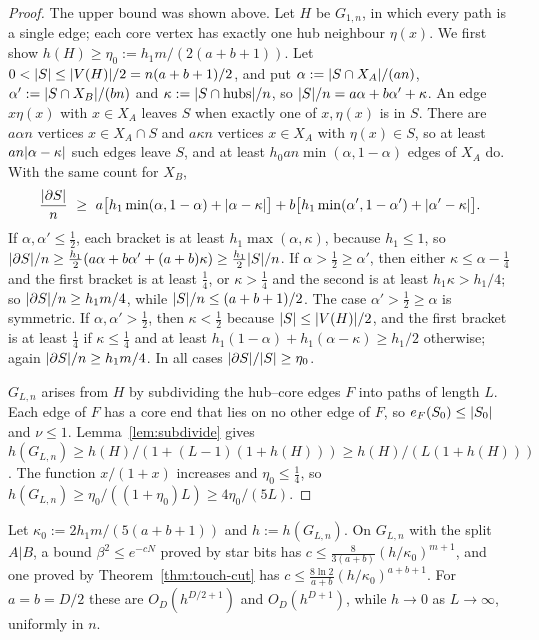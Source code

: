 \begin{proof}
The upper bound was shown above. Let $H$ be $G_{1,n}$, in which every path is a single edge; each core vertex has exactly one hub neighbour $\eta(x)$. We first show $h(H)\ge\eta_0:=h_1m/(2(a+b+1))$. Let $0<\lvert S\rvert\le\lvert V(H)\rvert/2=n(a+b+1)/2$, and put $\alpha:=\lvert S\cap X_A\rvert/(an)$, $\alpha':=\lvert S\cap X_B\rvert/(bn)$ and $\kappa:=\lvert S\cap\text{hubs}\rvert/n$, so $\lvert S\rvert/n=a\alpha+b\alpha'+\kappa$. An edge $x\eta(x)$ with $x\in X_A$ leaves $S$ when exactly one of $x,\eta(x)$ is in $S$. There are $a\alpha n$ vertices $x\in X_A\cap S$ and $a\kappa n$ vertices $x\in X_A$ with $\eta(x)\in S$, so at least $an\lvert \alpha-\kappa\rvert$ such edges leave $S$, and at least $h_0an\min(\alpha,1-\alpha)$ edges of $X_A$ do. With the same count for $X_B$,
\[
  \frac{\abs{\partial S}}n\ \ge\ a\bigl[h_1\min(\alpha,1-\alpha)+\abs{\alpha-\kappa}\bigr]+b\bigl[h_1\min(\alpha',1-\alpha')+\abs{\alpha'-\kappa}\bigr] .
\]
If $\alpha,\alpha'\le\frac12$, each bracket is at least $h_1\max(\alpha,\kappa)$, because $h_1\le1$, so $\lvert \partial S\rvert/n\ge\frac{h_1}2(a\alpha+b\alpha'+(a+b)\kappa)\ge\frac{h_1}2\lvert S\rvert/n$. If $\alpha>\frac12\ge\alpha'$, then either $\kappa\le\alpha-\frac14$ and the first bracket is at least $\frac14$, or $\kappa>\frac14$ and the second is at least $h_1\kappa>h_1/4$; so $\lvert \partial S\rvert/n\ge h_1m/4$, while $\lvert S\rvert/n\le(a+b+1)/2$. The case $\alpha'>\frac12\ge\alpha$ is symmetric. If $\alpha,\alpha'>\frac12$, then $\kappa<\frac12$ because $\lvert S\rvert\le\lvert V(H)\rvert/2$, and the first bracket is at least $\frac14$ if $\kappa\le\frac14$ and at least $h_1(1-\alpha)+h_1(\alpha-\kappa)\ge h_1/2$ otherwise; again $\lvert \partial S\rvert/n\ge h_1m/4$. In all cases $\lvert \partial S\rvert/\lvert S\rvert\ge\eta_0$.

$G_{L,n}$ arises from $H$ by subdividing the hub--core edges $F$ into paths of length $L$. Each edge of $F$ has a core end that lies on no other edge of $F$, so $e_F(S_0)\le\lvert S_0\rvert$ and $\nu\le1$. Lemma~\ref{lem:subdivide} gives $h(G_{L,n})\ge h(H)/(1+(L-1)(1+h(H)))\ge h(H)/(L(1+h(H)))$. The function $x/(1+x)$ increases and $\eta_0\le\frac14$, so $h(G_{L,n})\ge\eta_0/((1+\eta_0)L)\ge4\eta_0/(5L)$.
\end{proof}

\begin{corollary}\label{cor:hub}
Let $\kappa_0:=2h_1m/(5(a+b+1))$ and $h:=h(G_{L,n})$. On $G_{L,n}$ with the split $A|B$, a bound $\beta^2\le e^{-cN}$ proved by star bits has $c\le\frac8{3(a+b)}(h/\kappa_0)^{m+1}$, and one proved by Theorem~\ref{thm:touch-cut} has $c\le\frac{8\ln2}{a+b}(h/\kappa_0)^{a+b+1}$. For $a=b=D/2$ these are $O_D(h^{D/2+1})$ and $O_D(h^{D+1})$, while $h\to0$ as $L\to\infty$, uniformly in $n$.
\end{corollary}

